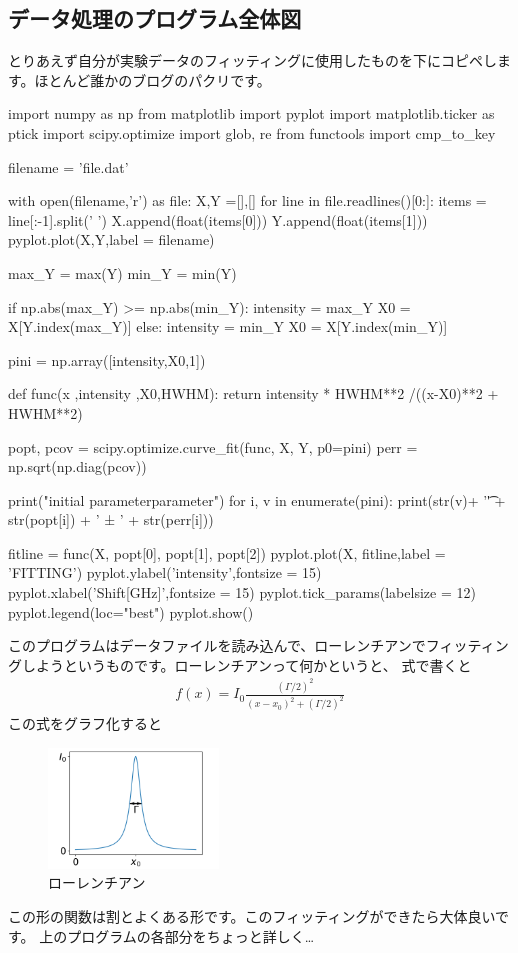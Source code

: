 \documentclass[11pt,b5paper,papersize,dvipdfmx]{jsbook}
\begin{document}
\subsection{データ処理のプログラム全体図}
とりあえず自分が実験データのフィッティングに使用したものを下にコピペします。ほとんど誰かのブログのパクリです。
\begin{kdncode-ii}
    import numpy as np
    from matplotlib import pyplot
    import matplotlib.ticker as ptick
    import scipy.optimize
    import glob, re
    from functools import cmp_to_key

    filename = 'file.dat'

    with open(filename,'r') as file:
        X,Y =[],[]
        for line in file.readlines()[0:]:
            items = line[:-1].split(' ')
            X.append(float(items[0]))
            Y.append(float(items[1]))
    pyplot.plot(X,Y,label = filename)

    max_Y = max(Y)
    min_Y = min(Y)

    if np.abs(max_Y) >= np.abs(min_Y):
        intensity = max_Y 
        X0 = X[Y.index(max_Y)]
    else:
        intensity = min_Y
        X0 = X[Y.index(min_Y)]

    pini = np.array([intensity,X0,1])

    def func(x ,intensity ,X0,HWHM):
        return intensity * HWHM**2 /((x-X0)**2 + HWHM**2)

    popt, pcov = scipy.optimize.curve_fit(func, X, Y, p0=pini)
    perr = np.sqrt(np.diag(pcov))

    print("initial parameter\toptimized parameter")
    for i, v  in enumerate(pini):
            print(str(v)+ '\t' + str(popt[i]) + ' ± ' + str(perr[i]))

    fitline = func(X, popt[0], popt[1], popt[2])
    pyplot.plot(X, fitline,label = 'FITTING')
    pyplot.ylabel('intensity',fontsize = 15)
    pyplot.xlabel('Shift[GHz]',fontsize = 15) 
    pyplot.tick_params(labelsize = 12)
    pyplot.legend(loc="best")  
    pyplot.show()
\end{kdncode-ii}
このプログラムはデータファイルを読み込んで、ローレンチアンでフィッティングしようというものです。ローレンチアンって何かというと、
式で書くと
\begin{align*}
    f(x) = I_0\frac{(\Gamma/2)^2}{(x - x_0)^2 + (\Gamma/2)^2}
\end{align*}
この式をグラフ化すると
\begin{figure}[H]
    \centering
    \includegraphics[height=32mm]{kadono/img/rorent.png}
    \caption{ローレンチアン}
    \label{fig:rorent}
\end{figure}\vspace{-1zw}
この形の関数は割とよくある形です。このフィッティングができたら大体良いです。
上のプログラムの各部分をちょっと詳しく…
\end{document}
